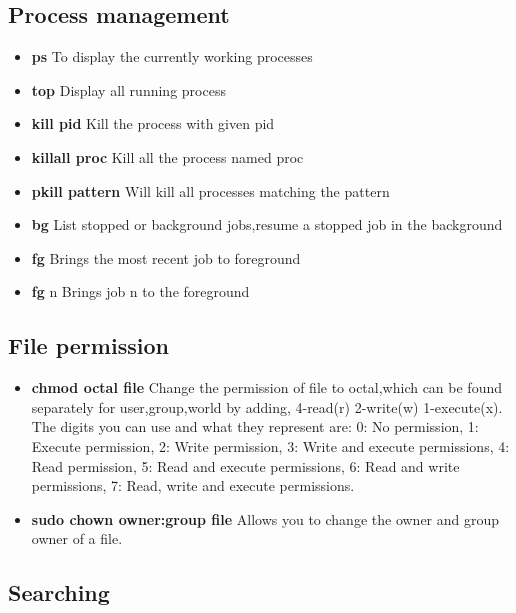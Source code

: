 \subsection{Process management}

\begin{itemize}
	\item \textbf{ps} To display the currently working processes
	\item \textbf{top} Display all running process
	\item \textbf{kill pid} Kill the process with given pid
	\item \textbf{killall proc} Kill all the process named proc
	\item \textbf{pkill pattern} Will kill all processes matching the pattern
	\item \textbf{bg} List stopped or background jobs,resume a stopped job in the background
	\item \textbf{fg} Brings the most recent job to foreground
	\item \textbf{fg} n Brings job n to the foreground
\end{itemize} 

\subsection{File permission}

\begin{itemize}
	\item \textbf{chmod octal file} Change the permission of file to octal,which can be found separately for user,group,world by adding, 4-read(r) 2-write(w) 1-execute(x). The digits you can use and what they represent are: 0: No permission, 1: Execute permission, 2: Write permission, 3: Write and execute permissions, 4: Read permission, 5: Read and execute permissions, 6: Read and write permissions, 7: Read, write and execute permissions.	
	\item \textbf{sudo chown owner:group file} Allows you to change the owner and group owner of a file.
\end{itemize}

\subsection{Searching}

